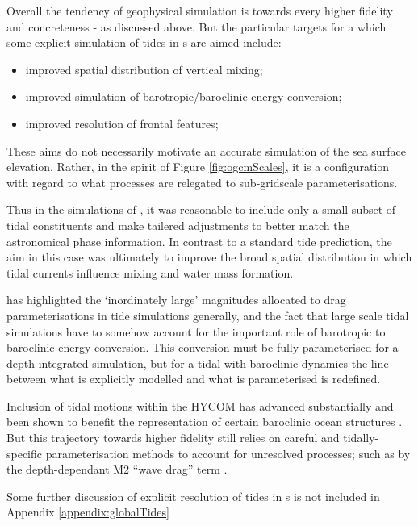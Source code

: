 Overall the tendency of geophysical simulation is towards every higher fidelity and concreteness - as discussed above. But the particular targets for a which some explicit simulation of tides in \OGCM{}s are aimed include:
\begin{itemize}
    \item improved spatial distribution of vertical mixing;
    \item improved simulation of barotropic/baroclinic energy conversion;
    \item improved resolution of frontal features;
\end{itemize}
These aims do not necessarily motivate an accurate simulation of the sea surface elevation.
Rather, in the spirit of Figure \ref{fig:ogcmScales}, it is a configuration with regard to what processes are relegated to sub-gridscale parameterisations.

Thus in the \OFAM{} simulations of \citep{Schiller:2004fv},  it was reasonable to include only a small subset of tidal constituents and make tailered adjustments to better match the astronomical phase information.  In contrast to a standard tide prediction,  the aim in this case was ultimately to improve the broad spatial distribution in which tidal currents influence mixing and water mass formation.

\citep{Arbic:2004wz} has highlighted the `inordinately large' magnitudes allocated to drag parameterisations in tide simulations generally, and the fact that large scale tidal simulations have to somehow account for the important role of barotropic to baroclinic energy conversion.   This conversion must be fully parameterised for a depth integrated simulation, but for a tidal \OCGM{} with baroclinic dynamics the line between what is explicitly modelled and what is parameterised is redefined.  

Inclusion of tidal motions within the HYCOM \OGCM{} has advanced substantially and been shown to benefit the representation of certain baroclinic ocean structures  \citep{10.1016/j.ocemod.2019.02.008}.    But this trajectory towards higher fidelity still relies on careful and tidally-specific parameterisation methods to account for unresolved processes; such as by the depth-dependant M2 ``wave drag'' term \citep{Jayne:2001tr}.

Some further discussion of explicit resolution of tides in \OCGM{}s is not included in Appendix \ref{appendix:globalTides}



